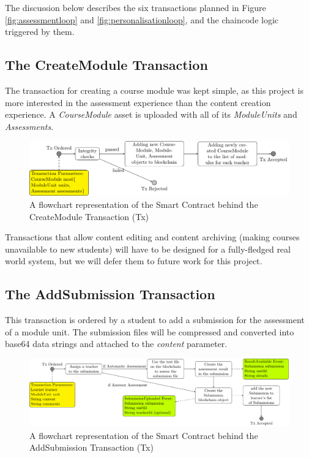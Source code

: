 The discussion below describes the six transactions planned in Figure \ref{fig:assessmentloop} and \ref{fig:personalisationloop}, 
and the chaincode logic triggered by them.

\subsection{The CreateModule Transaction}

The transaction for creating a course module was kept simple, as this project is more interested in the assessment experience than the 
content creation experience. A \textit{CourseModule} asset is uploaded with all of its \textit{ModuleUnits} and \textit{Assessments}. 

\begin{figure}[!ht]
    \centering
    \includegraphics[width=1.0\textwidth]{cmtx}
    \caption{A flowchart representation of the Smart Contract behind the CreateModule Transaction (Tx)} \label{fig:cmtx}
\end{figure}

Transactions that allow content editing and content archiving (making courses unavailable to new students) will have to be designed 
for a fully-fledged real world system, but we will defer them to future work for this project.

\subsection{The AddSubmission Transaction}

This transaction is ordered by a student to add a submission for the assessment of a module unit. The submission files will be 
compressed and converted into base64 data strings and attached to the \textit{content} parameter.

\begin{figure}[!ht]
    \centering
    \includegraphics[width=1.0\textwidth]{astx}
    \caption{A flowchart representation of the Smart Contract behind the AddSubmission Transaction (Tx)} \label{fig:astx}
\end{figure}

